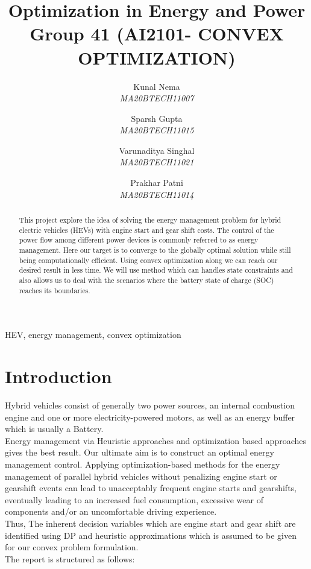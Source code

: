 \documentclass[conference]{IEEEtran}
\begin{document}
\title{Optimization in Energy and Power\\
{\footnotesize Group 41 (AI2101- CONVEX OPTIMIZATION)}
}

\author{

 Kunal Nema\\\emph{MA20BTECH11007}\\ 
\and Sparsh Gupta\\ \emph{MA20BTECH11015}\\ 
\and Varunaditya  Singhal\\ \emph{MA20BTECH11021}\\ 
\and Prakhar Patni \\ \emph{MA20BTECH11014}\\ 
}



\maketitle

\begin{abstract}
This project explore the idea of solving the energy management problem for hybrid electric vehicles (HEVs) with engine start and gear shift costs. The control of the power flow among different power devices is commonly referred to as energy management. Here our target is to converge to the globally optimal solution while still being computationally efficient. Using convex optimization along we can reach our desired result in less time. We will use method which can handles state constraints and also allows us to deal with the scenarios where the battery state of charge (SOC) reaches its boundaries.
\end{abstract}

\begin{IEEEkeywords}
HEV, energy management, convex optimization
\end{IEEEkeywords}

\section{\textbf{Introduction}}
Hybrid vehicles consist of generally two power sources, an internal combustion engine and one or more electricity-powered motors, as well as an energy buffer which is usually a Battery. \\
 Energy management via Heuristic approaches and optimization based approaches gives the best result. Our ultimate aim is to construct an optimal energy management control. Applying optimization-based methods for the energy management of parallel hybrid vehicles without penalizing engine start or gearshift events can lead to unacceptably frequent engine starts and gearshifts, eventually leading to an increased fuel consumption, excessive wear of components and/or an uncomfortable driving experience. \\
 Thus, The inherent decision variables which are engine start and gear shift are identified using DP and heuristic approximations which is assumed to be given for our convex problem formulation. \\
The report is structured as follows:
\end{document}
